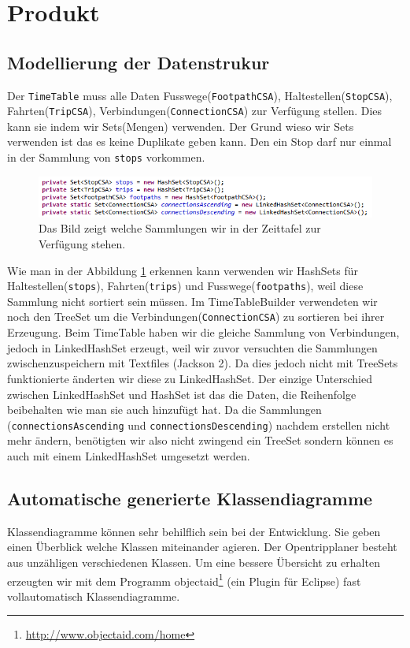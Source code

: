 \section{Produkt}



\subsection{Modellierung der Datenstrukur}
Der \texttt{TimeTable} muss alle Daten Fusswege(\texttt{FootpathCSA}), Haltestellen(\texttt{StopCSA}), Fahrten(\texttt{TripCSA}), Verbindungen(\texttt{ConnectionCSA}) zur Verfügung stellen. Dies kann sie indem wir Sets(Mengen) verwenden. Der Grund wieso wir Sets verwenden ist das es keine Duplikate geben kann. Den ein Stop darf nur einmal in der Sammlung von \texttt{stops} vorkommen.
\begin{figure}[h]
	\centering
	\includegraphics[width=12cm]{img/Sammlungen.png}
	\caption{Das Bild zeigt welche Sammlungen wir in der Zeittafel zur Verfügung stehen.}
	\label{fig:Sammlungen}
\end{figure}
\newline
Wie man in der Abbildung \ref{fig:Sammlungen} erkennen kann verwenden wir HashSets für Haltestellen(\texttt{stops}), Fahrten(\texttt{trips}) und Fusswege(\texttt{footpaths}), weil diese Sammlung nicht sortiert sein müssen. Im TimeTableBuilder verwendeten wir noch den TreeSet um die Verbindungen(\texttt{ConnectionCSA}) zu sortieren bei ihrer Erzeugung. Beim TimeTable haben wir die gleiche Sammlung von Verbindungen, jedoch in LinkedHashSet erzeugt, weil wir zuvor versuchten die Sammlungen zwischenzuspeichern mit Textfiles (Jackson 2). Da dies jedoch nicht mit TreeSets funktionierte änderten wir diese zu LinkedHashSet. Der einzige Unterschied zwischen LinkedHashSet und HashSet ist das die Daten, die Reihenfolge beibehalten wie man sie auch hinzufügt hat. Da die Sammlungen (\texttt{connectionsAscending} und \texttt{connectionsDescending}) nachdem erstellen nicht mehr ändern, benötigten wir also nicht zwingend ein TreeSet sondern können es auch mit einem LinkedHashSet umgesetzt werden.


\subsection{Automatische generierte Klassendiagramme}
Klassendiagramme können sehr behilflich sein bei der Entwicklung. Sie geben einen Überblick welche Klassen miteinander agieren.
Der Opentripplaner besteht aus unzähligen verschiedenen Klassen. Um eine bessere Übersicht zu erhalten erzeugten wir mit dem Programm objectaid\footnote{\url{http://www.objectaid.com/home}} (ein Plugin für Eclipse) fast vollautomatisch Klassendiagramme. 


